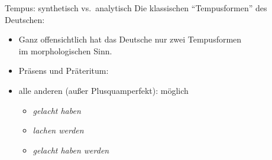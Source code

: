 \begin{frame}
  {Tempus: synthetisch vs.\ analytisch}
  \pause
  Die klassischen "`Tempusformen"' des Deutschen:\\
  \Halbzeile
  \pause
  \begin{center}
  \end{center}
  \pause
  \begin{itemize}[<+->]
    \item \alert{Ganz offensichtlich hat das Deutsche nur zwei Tempusformen\\
      im morphologischen Sinn.}
    \item Präsens und Präteritum: 
    \item alle anderen (außer Plusquamperfekt):  möglich
      \begin{itemize}[<+->]
        \item \textit{gelacht haben}
        \item \textit{lachen werden}
        \item \textit{gelacht haben werden}
      \end{itemize}
  \end{itemize} 
\end{frame}

